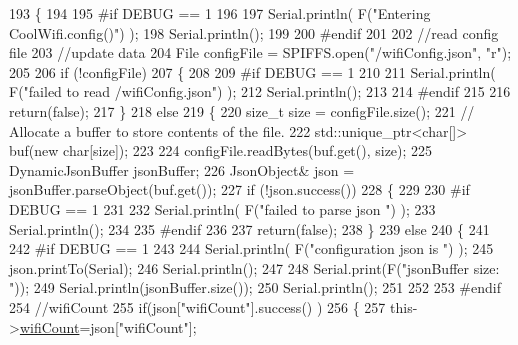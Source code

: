 \begin{DoxyCode}
193 \{
194 
195 \textcolor{preprocessor}{#if DEBUG == 1 }
196 
197     Serial.println( F(\textcolor{stringliteral}{"Entering CoolWifi.config()"}) );
198     Serial.println();
199 
200 \textcolor{preprocessor}{#endif}
201 
202     \textcolor{comment}{//read config file}
203     \textcolor{comment}{//update data}
204     File configFile = SPIFFS.open(\textcolor{stringliteral}{"/wifiConfig.json"}, \textcolor{stringliteral}{"r"});
205 
206     \textcolor{keywordflow}{if} (!configFile) 
207     \{
208     
209 \textcolor{preprocessor}{    #if DEBUG == 1 }
210 
211         Serial.println( F(\textcolor{stringliteral}{"failed to read /wifiConfig.json"}) );
212         Serial.println();
213 
214 \textcolor{preprocessor}{    #endif}
215 
216         \textcolor{keywordflow}{return}(\textcolor{keyword}{false});
217     \}
218     \textcolor{keywordflow}{else}
219     \{
220         \textcolor{keywordtype}{size\_t} size = configFile.size();
221         \textcolor{comment}{// Allocate a buffer to store contents of the file.}
222         std::unique\_ptr<char[]> buf(\textcolor{keyword}{new} \textcolor{keywordtype}{char}[size]);
223 
224         configFile.readBytes(buf.get(), size);
225         DynamicJsonBuffer jsonBuffer;
226         JsonObject& json = jsonBuffer.parseObject(buf.get());
227         \textcolor{keywordflow}{if} (!json.success()) 
228         \{
229         
230 \textcolor{preprocessor}{        #if DEBUG == 1 }
231 
232             Serial.println( F(\textcolor{stringliteral}{"failed to parse json "}) );
233             Serial.println();
234         
235 \textcolor{preprocessor}{        #endif}
236             
237             \textcolor{keywordflow}{return}(\textcolor{keyword}{false});
238         \} 
239         \textcolor{keywordflow}{else}
240         \{
241         
242 \textcolor{preprocessor}{        #if DEBUG == 1 }
243         
244             Serial.println( F(\textcolor{stringliteral}{"configuration json is "}) );
245             json.printTo(Serial);
246             Serial.println();
247 
248             Serial.print(F(\textcolor{stringliteral}{"jsonBuffer size: "}));
249             Serial.println(jsonBuffer.size());
250             Serial.println();
251 
252 
253 \textcolor{preprocessor}{        #endif}
254             \textcolor{comment}{//wifiCount}
255             \textcolor{keywordflow}{if}(json[\textcolor{stringliteral}{"wifiCount"}].success() )
256             \{           
257                 this->\hyperlink{classCoolWifi_ab133bd92fcb895b884deecd6678592e4}{wifiCount}=json[\textcolor{stringliteral}{"wifiCount"}];

\end{DoxyCode}
